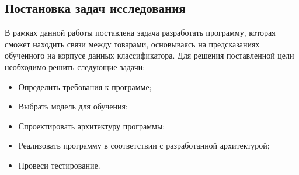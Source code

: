 \newpage
\subsection{Постановка задач исследования}
В рамках данной работы поставлена задача разработать программу, которая сможет находить связи между товарами, основываясь на предсказаниях обученного на корпусе данных классификатора.
Для решения поставленной цели необходимо решить следующие задачи:
\begin{itemize}
  \item Определить требования к программе;
  \item Выбрать модель для обучения;
  \item Спроектировать архитектуру программы;
  \item Реализовать программу в соответствии с разработанной архитектурой;
  \item Провеси тестирование.
\end{itemize}
\newpage
